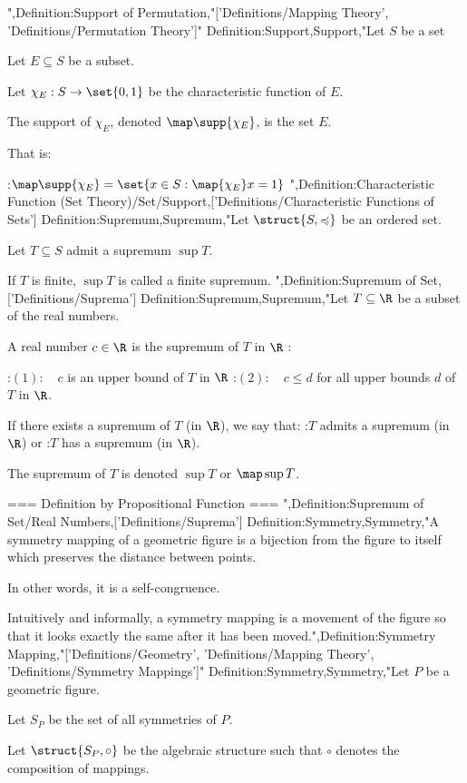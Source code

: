 ",Definition:Support of Permutation,"['Definitions/Mapping Theory', 'Definitions/Permutation Theory']"
Definition:Support,Support,"Let $S$ be a set

Let $E \subseteq S$ be a subset.

Let $\chi_E: S \to \set {0, 1}$ be the characteristic function of $E$.


The support of $\chi_E$, denoted $\map \supp {\chi_E}$, is the set $E$.

That is:

:$\map \supp {\chi_E} = \set {x \in S: \map {\chi_E} x = 1}$
",Definition:Characteristic Function (Set Theory)/Set/Support,['Definitions/Characteristic Functions of Sets']
Definition:Supremum,Supremum,"Let $\struct {S, \preccurlyeq}$ be an ordered set.

Let $T \subseteq S$ admit a supremum $\sup T$.


If $T$ is finite, $\sup T$ is called a finite supremum.
",Definition:Supremum of Set,['Definitions/Suprema']
Definition:Supremum,Supremum,"Let $T \subseteq \R$ be a subset of the real numbers.


A real number $c \in \R$ is the supremum of $T$ in $\R$ :

:$(1): \quad c$ is an upper bound of $T$ in $\R$
:$(2): \quad c \le d$ for all upper bounds $d$ of $T$ in $\R$.


If there exists a supremum of $T$ (in $\R$), we say that:
:$T$ admits a supremum (in $\R$) or
:$T$ has a supremum (in $\R$).


The supremum of $T$ is denoted $\sup T$ or $\map \sup T$.


=== Definition by Propositional Function ===
",Definition:Supremum of Set/Real Numbers,['Definitions/Suprema']
Definition:Symmetry,Symmetry,"A symmetry mapping of a geometric figure is a bijection from the figure to itself which preserves the distance between points.

In other words, it is a self-congruence.


Intuitively and informally, a symmetry mapping is a movement of the figure so that it looks exactly the same after it has been moved.",Definition:Symmetry Mapping,"['Definitions/Geometry', 'Definitions/Mapping Theory', 'Definitions/Symmetry Mappings']"
Definition:Symmetry,Symmetry,"Let $P$ be a geometric figure.

Let $S_P$ be the set of all symmetries of $P$.

Let $\struct {S_P, \circ}$ be the algebraic structure such that $\circ$ denotes the composition of mappings.


